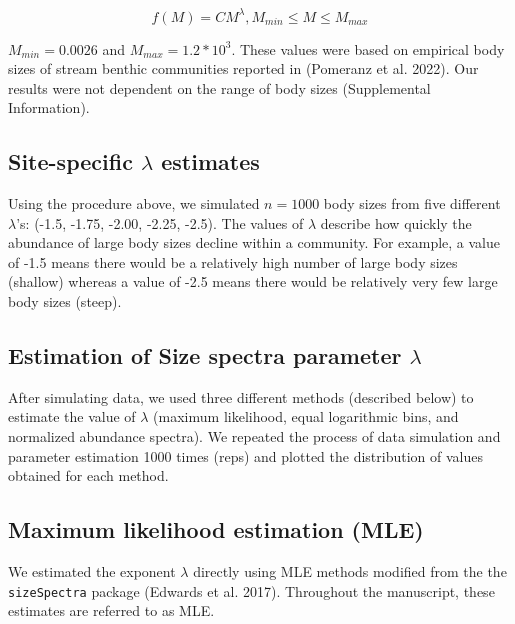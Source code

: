 \documentclass[
]{article}
\begin{document}
\[f(M) = CM^\lambda, M_{min} \le M \le M_{max}\]

\(M_{min} = 0.0026\) and \(M_{max} = 1.2 *10^3\). These values were
based on empirical body sizes of stream benthic communities reported in
(Pomeranz et al. 2022). Our results were not dependent on the range of
body sizes (Supplemental Information).

\hypertarget{site-specific-lambda-estimates}{%
\subsection{\texorpdfstring{Site-specific \(\lambda\)
estimates}{Site-specific \textbackslash lambda estimates}}\label{site-specific-lambda-estimates}}

Using the procedure above, we simulated \(n = 1000\) body sizes from
five different \(\lambda\)'s: (-1.5, -1.75, -2.00, -2.25, -2.5). The
values of \(\lambda\) describe how quickly the abundance of large body
sizes decline within a community. For example, a value of -1.5 means
there would be a relatively high number of large body sizes (shallow)
whereas a value of -2.5 means there would be relatively very few large
body sizes (steep).

\hypertarget{estimation-of-size-spectra-parameter-lambda}{%
\subsection{\texorpdfstring{Estimation of Size spectra parameter
\(\lambda\)}{Estimation of Size spectra parameter \textbackslash lambda}}\label{estimation-of-size-spectra-parameter-lambda}}

After simulating data, we used three different methods (described below)
to estimate the value of \(\lambda\) (maximum likelihood, equal
logarithmic bins, and normalized abundance spectra). We repeated the
process of data simulation and parameter estimation 1000 times (reps)
and plotted the distribution of values obtained for each method.

\hypertarget{maximum-likelihood-estimation-mle}{%
\subsection{Maximum likelihood estimation
(MLE)}\label{maximum-likelihood-estimation-mle}}

We estimated the exponent \(\lambda\) directly using MLE methods
modified from the the \texttt{sizeSpectra} package (Edwards et al.
2017). Throughout the manuscript, these estimates are referred to as
MLE.
\end{document}
